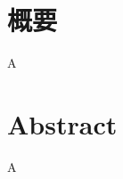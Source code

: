 \section*{概要}
{\setlength{\baselineskip}{6.6mm}
\large
A
}
\newpage
\vspace{-5mm}

\section*{Abstract}
{\large
A
}
